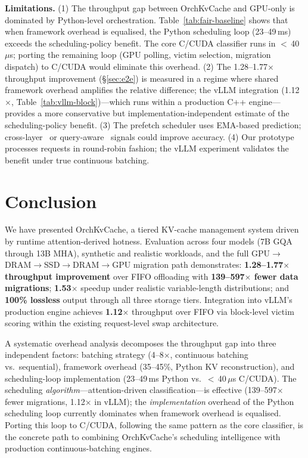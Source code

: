\documentclass[conference]{IEEEtran}
\begin{document}
\textbf{Limitations.} (1) The throughput gap between OrchKvCache and GPU-only is dominated by Python-level orchestration.  Table~\ref{tab:fair-baseline} shows that when framework overhead is equalised, the Python scheduling loop (23--49\,ms) exceeds the scheduling-policy benefit.  The core C/CUDA classifier runs in $<$\,40\,$\mu$s; porting the remaining loop (GPU polling, victim selection, migration dispatch) to C/CUDA would eliminate this overhead.  (2) The 1.28--1.77$\times$ throughput improvement (\S\ref{sec:e2e}) is measured in a regime where shared framework overhead amplifies the relative difference; the vLLM integration (1.12$\times$, Table~\ref{tab:vllm-block})---which runs within a production C++ engine---provides a more conservative but implementation-independent estimate of the scheduling-policy benefit.  (3) The prefetch scheduler uses EMA-based prediction; cross-layer~\cite{infinigen} or query-aware~\cite{quest} signals could improve accuracy.  (4) Our prototype processes requests in round-robin fashion; the vLLM experiment validates the benefit under true continuous batching.

\section{Conclusion}

We have presented OrchKvCache, a tiered KV-cache management system driven by runtime attention-derived hotness. Evaluation across four models (7B GQA through 13B MHA), synthetic and realistic workloads, and the full GPU$\to$DRAM$\to$SSD$\to$DRAM$\to$GPU migration path demonstrates: \textbf{1.28--1.77$\times$ throughput improvement} over FIFO offloading with \textbf{139--597$\times$ fewer data migrations}; \textbf{1.53$\times$} speedup under realistic variable-length distributions; and \textbf{100\% lossless} output through all three storage tiers. Integration into vLLM's production engine achieves \textbf{1.12$\times$} throughput over FIFO via block-level victim scoring within the existing request-level swap architecture.

A systematic overhead analysis decomposes the throughput gap into three independent factors: batching strategy (4--8$\times$, continuous batching vs.\ sequential), framework overhead (35--45\%, Python KV reconstruction), and scheduling-loop implementation (23--49\,ms Python vs.\ $<$\,40\,$\mu$s C/CUDA). The scheduling \emph{algorithm}---attention-driven classification---is effective (139--597$\times$ fewer migrations, 1.12$\times$ in vLLM); the \emph{implementation} overhead of the Python scheduling loop currently dominates when framework overhead is equalised. Porting this loop to C/CUDA, following the same pattern as the core classifier, is the concrete path to combining OrchKvCache's scheduling intelligence with production continuous-batching engines.
\end{document}
